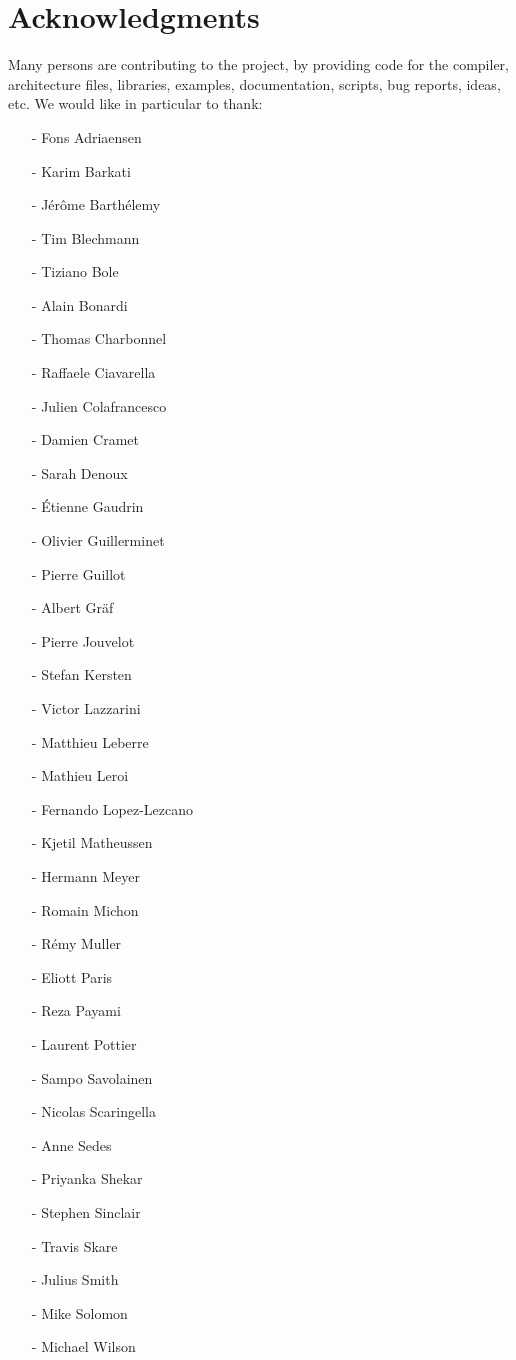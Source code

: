 \chapter{Acknowledgments}
Many persons are contributing to the \faust project, by providing code for the compiler, architecture files, libraries, examples, documentation, scripts, bug reports, ideas, etc. We would like in particular to thank:

\begin{itemize}
\setlength\itemsep{0em}
\item[-]Fons Adriaensen	
\item[-]Karim Barkati
\item[-]J\'er\^ome Barth\'elemy
\item[-]Tim Blechmann
\item[-]Tiziano Bole	
\item[-]Alain Bonardi
\item[-]Thomas Charbonnel
\item[-]Raffaele Ciavarella
\item[-]Julien Colafrancesco
\item[-]Damien Cramet
\item[-]Sarah Denoux
\item[-]\'Etienne Gaudrin
\item[-]Olivier Guillerminet
\item[-]Pierre Guillot
\item[-]Albert Gr\"af
\item[-]Pierre Jouvelot
\item[-]Stefan Kersten
\item[-]Victor Lazzarini
\item[-]Matthieu Leberre
\item[-]Mathieu Leroi
\item[-]Fernando Lopez-Lezcano
\item[-]Kjetil Matheussen
\item[-]Hermann Meyer
\item[-]Romain Michon
\item[-]R\'emy Muller
\item[-]Eliott Paris
\item[-]Reza Payami
\item[-]Laurent Pottier
\item[-]Sampo Savolainen
\item[-]Nicolas Scaringella
\item[-]Anne Sedes
\item[-]Priyanka Shekar
\item[-]Stephen Sinclair
\item[-]Travis Skare
\item[-]Julius Smith
\item[-]Mike Solomon
\item[-]Michael Wilson
\end{itemize}
